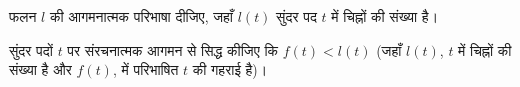\documentclass[../../../include/open-logic-section]{subfiles}
\begin{document}
\begin{prob}
  फलन $l$ की आगमनात्मक परिभाषा दीजिए, जहाँ $l(t)$ सुंदर पद $t$ में चिह्नों
  की संख्या है।
\end{prob}

\begin{prob}
  सुंदर पदों $t$ पर संरचनात्मक आगमन से सिद्ध कीजिए कि $f(t)<l(t)$ (जहाँ
  $l(t)$, $t$ में चिह्नों की संख्या है और $f(t)$,
   में परिभाषित $t$ की गहराई है)।
\end{prob}
\end{document}
